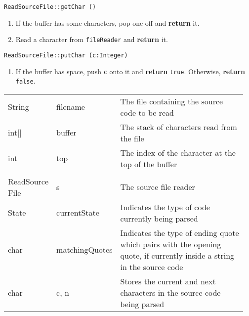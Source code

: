 \vspace{5mm}
\texttt{ReadSourceFile::getChar ()}
\begin{enumerate}
	\item If the buffer has some characters, pop one off and \textbf{return} it.
	\item Read a character from \texttt{fileReader} and \textbf{return} it.
\end{enumerate}
\vspace{5mm}
\texttt{ReadSourceFile::putChar (c:Integer)}
\begin{enumerate}
	\item If the buffer has space, push \texttt{c} onto it and \textbf{return} \texttt{true}. Otherwise, 
		\textbf{return} \texttt{false}.
\end{enumerate}

\clearpage
\sourcecode




\varDescription
\begin{longtable} {| >{\ttfamily}p{0.16\linewidth} | >{\ttfamily}p{0.2\linewidth}| p{0.6\linewidth} |}
\hline\multicolumn{3}{|c|}{\tt ReadSourceFile} 		\\\hline
String		&	filename	&	The file containing the source code to be read \\\hline
int[]		&	buffer		&	The stack of characters read from the file \\\hline
int 		&	top		&	The index of the character at the top of the buffer \\\hline
\hline\multicolumn{3}{|c|}{\tt RemoveComments::main(String[])} 		\\\hline
ReadSource\newline
	File	&	s		&	The source file reader \\\hline
State		&	currentState	&	Indicates the type of code currently being parsed \\\hline
char		&	matchingQuotes	&	Indicates the type of ending quote which pairs with the opening quote,
						if currently inside a string in the source code \\\hline
char		&	c, n		&	Stores the current and next characters in the source code being parsed \\\hline
\end{longtable}
